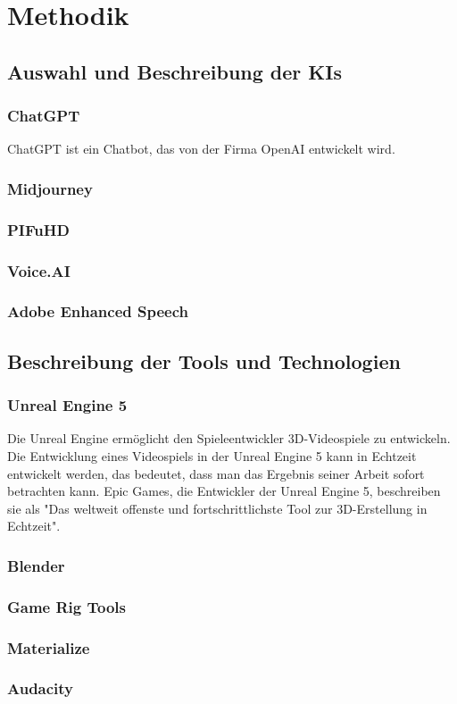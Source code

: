\chapter{Methodik}

\section{Auswahl und Beschreibung der KIs}
\subsection{ChatGPT}
ChatGPT ist ein Chatbot, das von der Firma OpenAI entwickelt wird.
\subsection{Midjourney}
\subsection{PIFuHD}
\subsection{Voice.AI}
\subsection{Adobe Enhanced Speech}

\section{Beschreibung der Tools und Technologien}
\subsection{Unreal Engine 5}
Die Unreal Engine ermöglicht den Spieleentwickler 3D-Videospiele zu entwickeln. Die Entwicklung eines Videospiels in der Unreal Engine 5 kann in Echtzeit entwickelt werden, das bedeutet, dass man das Ergebnis seiner Arbeit sofort betrachten kann. Epic Games, die Entwickler der Unreal Engine 5, beschreiben sie als "Das weltweit offenste und fortschrittlichste Tool zur 3D-Erstellung in Echtzeit".
\subsection{Blender}
\subsection{Game Rig Tools}
\subsection{Materialize}
\subsection{Audacity}
